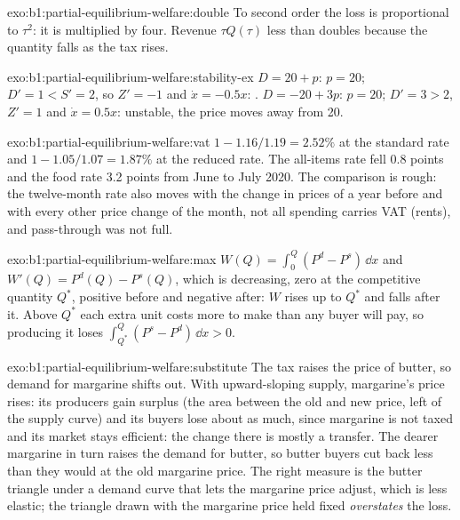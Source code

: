 \begin{solution}{exo:b1:partial-equilibrium-welfare:double}
To second order the loss is proportional to $\tau^2$: it is multiplied by
four. Revenue $\tau Q(\tau)$ less than doubles because the quantity falls as the
tax rises.
\end{solution}

\begin{solution}{exo:b1:partial-equilibrium-welfare:stability-ex}
$D = 20 + p$:  $p = 20$; $D' = 1 < S' = 2$, so $Z' = -1$ and
$\dot x = -0.5x$: . $D = -20 + 3p$:  $p = 20$; $D' = 3 > 2$, $Z' = 1$ and
$\dot x = 0.5x$: unstable, the price moves away from 20.
\end{solution}

\begin{solution}{exo:b1:partial-equilibrium-welfare:vat}
$1 - 1.16/1.19 = 2.52\%$ at the standard rate and $1 - 1.05/1.07 = 1.87\%$ at the
reduced rate. The all-items rate fell 0.8 points and the food rate 3.2
points from June to July 2020. The comparison is rough: the twelve-month
rate also moves with the change in prices of a year before and with every
other price change of the month, not all spending carries VAT (rents), and
pass-through was not full.
\end{solution}

\begin{solution}{exo:b1:partial-equilibrium-welfare:max}
$W(Q) = \int_0^Q(P^d - P^s)\,\dd x$ and $W'(Q) = P^d(Q) - P^s(Q)$, which is decreasing, zero at
the competitive quantity $Q^*$, positive before and negative after: $W$ rises
up to $Q^*$ and falls after it. Above $Q^*$ each extra unit costs more to
make than any buyer will pay, so producing it loses
$\int_{Q^*}^Q(P^s - P^d)\,\dd x > 0$.
\end{solution}

\begin{solution}{exo:b1:partial-equilibrium-welfare:substitute}
The tax raises the price of butter, so demand for margarine shifts out. With
upward-sloping supply, margarine's price rises: its producers gain surplus
(the area between the old and new price, left of the supply curve) and its
buyers lose about as much, since margarine is not taxed and its market stays
efficient: the change there is mostly a transfer. The dearer margarine in
turn raises the demand for butter, so butter buyers cut back less than they
would at the old margarine price. The right measure is the butter triangle
under a demand curve that lets the margarine price adjust, which is less
elastic; the triangle drawn with the margarine price held fixed
\emph{overstates} the loss.
\end{solution}

